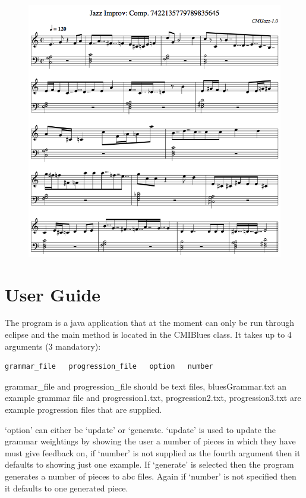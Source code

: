 \documentclass[pdftex,12pt,a4paper]{report}
\begin{document}
\begin{appendices}
\begin{figure}[here]
  \centering
  \includegraphics[scale=0.65]{figure/flymeprog1.png}
  \label{fig:flymeprog1}
\end{figure}


\chapter{User Guide}
The program is a java application that at the moment can only be run through eclipse and the main method is located in the CMIBlues class. It takes up to 4 arguments (3 mandatory):

\begin{verbatim}
grammar_file   progression_file   option   number
\end{verbatim}

grammar_file and progression_file should be text files, bluesGrammar.txt an example grammar file and  progression1.txt, progression2.txt, progression3.txt are example progression files that are supplied.

`option' can either be `update' or `generate. `update' is used to update the grammar weightings by showing the user a number of pieces in which they have must give feedback on, if `number' is not supplied as the fourth argument then it defaults to showing just one example. If `generate' is selected then the program generates a number of pieces to abc files. Again if `number' is not specified then it defaults to one generated piece.


\end{appendices}
\end{document}
